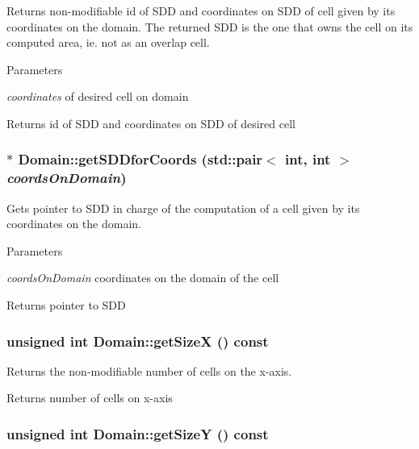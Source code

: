 Returns non-\/modifiable id of SDD and coordinates on SDD of cell given by its coordinates on the domain. The returned SDD is the one that owns the cell on its computed area, ie. not as an overlap cell.


\begin{DoxyParams}{Parameters}
\item[{\em coordinates}]of desired cell on domain\end{DoxyParams}
\begin{DoxyReturn}{Returns}
id of SDD and coordinates on SDD of desired cell 
\end{DoxyReturn}
\hypertarget{classDomain_a893851a7caff52261beb79888d46be1f}{
\subsubsection[{getSDDforCoords}]{ $\ast$ Domain::getSDDforCoords (std::pair$<$ int, int $>$ {\em coordsOnDomain})}}
\label{classDomain_a893851a7caff52261beb79888d46be1f}


Gets pointer to SDD in charge of the computation of a cell given by its coordinates on the domain. 
\begin{DoxyParams}{Parameters}
\item[{\em coordsOnDomain}]coordinates on the domain of the cell\end{DoxyParams}
\begin{DoxyReturn}{Returns}
pointer to SDD 
\end{DoxyReturn}
\hypertarget{classDomain_a3185aba80f5397341e5a81d84e2bc8f9}{
\subsubsection[{getSizeX}]{\setlength{\rightskip}{0pt plus 5cm}unsigned int Domain::getSizeX () const}}
\label{classDomain_a3185aba80f5397341e5a81d84e2bc8f9}


Returns the non-\/modifiable number of cells on the x-\/axis. \begin{DoxyReturn}{Returns}
number of cells on x-\/axis 
\end{DoxyReturn}
\hypertarget{classDomain_a0e7519f6560ddaea2c7c84785441da9a}{
\subsubsection[{getSizeY}]{\setlength{\rightskip}{0pt plus 5cm}unsigned int Domain::getSizeY () const}}
\label{classDomain_a0e7519f6560ddaea2c7c84785441da9a}


